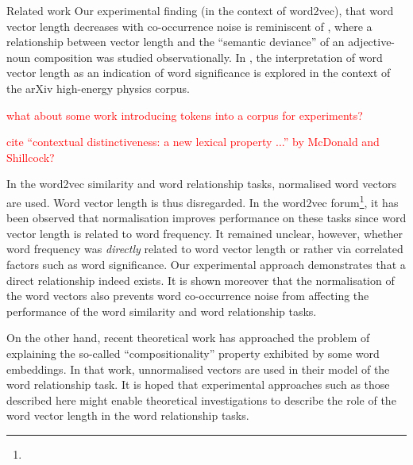 \documentclass{article} %
\begin{document}
\begin{section}{Related work}\label{related-work}
Our experimental finding (in the context of word2vec), that word vector length decreases with co-occurrence noise is reminiscent of \cite{vecchi-baroni-zamparelli2011}, where a relationship between vector length and the ``semantic deviance'' of an adjective-noun composition was studied observationally.
In \cite{schakel-wilson}, the interpretation of word vector length as an indication of word significance is explored in the context of the arXiv high-energy physics corpus.

\textcolor{red}{what about some work introducing tokens into a corpus for experiments?}

\textcolor{red}{cite ``contextual distinctiveness: a new lexical property ...'' by McDonald and Shillcock?}

In the word2vec similarity and word relationship tasks, normalised word vectors are used.
Word vector length is thus disregarded.
In the word2vec forum\footnote{\googlegroup}, it has been observed that normalisation improves performance on these tasks since word vector length is related to word frequency.
It remained unclear, however, whether word frequency was \textit{directly} related to word vector length or rather via correlated factors such as word significance.
Our experimental approach demonstrates that a direct relationship indeed exists.
It is shown moreover that the normalisation of the word vectors also prevents word co-occurrence noise from affecting the performance of the word similarity and word relationship tasks.

On the other hand, recent theoretical work \cite{Arora2015} has approached the problem of explaining the so-called ``compositionality'' property exhibited by some word embeddings.
In that work, unnormalised vectors are used in their model of the word relationship task.
It is hoped that experimental approaches such as those described here might enable theoretical investigations to describe the role of the word vector length in the word relationship tasks.
\end{section}
\end{document}
